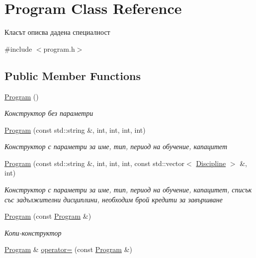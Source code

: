\hypertarget{class_program}{}\section{Program Class Reference}
\label{class_program}


Класът описва дадена специалност  




{\ttfamily \#include $<$program.\+h$>$}

\subsection*{Public Member Functions}
\begin{DoxyCompactItemize}
\item 
\hyperlink{class_program_aaefaa0df08f3484476fc4d61e97acbdc}{Program} ()
\begin{DoxyCompactList}\small\item\em Конструктор без параметри \end{DoxyCompactList}\item 
\hyperlink{class_program_a15ba07f06c4cabc4c1f83fdcc5f755cc}{Program} (const std\+::string \&, int, int, int, int)
\begin{DoxyCompactList}\small\item\em Конструктор с параметри за име, тип, период на обучение, капацитет \end{DoxyCompactList}\item 
\hyperlink{class_program_afbe3ef7707295335af806e420bc4eb2c}{Program} (const std\+::string \&, int, int, int, const std\+::vector$<$ \hyperlink{class_discipline}{Discipline} $>$ \&, int)
\begin{DoxyCompactList}\small\item\em Конструктор с параметри за име, тип, период на обучение, капацитет, списък със задължителни дисциплини, необходим брой кредити за завършване \end{DoxyCompactList}\item 
\hyperlink{class_program_aa81dab37b223bfc53c08f56d437ada28}{Program} (const \hyperlink{class_program}{Program} \&)
\begin{DoxyCompactList}\small\item\em Копи-\/конструктор \end{DoxyCompactList}\item 
\hyperlink{class_program}{Program} \& \hyperlink{class_program_a7eb820964390f06b3170e467af2631fb}{operator=} (const \hyperlink{class_program}{Program} \&)

\end{DoxyCompactItemize}
